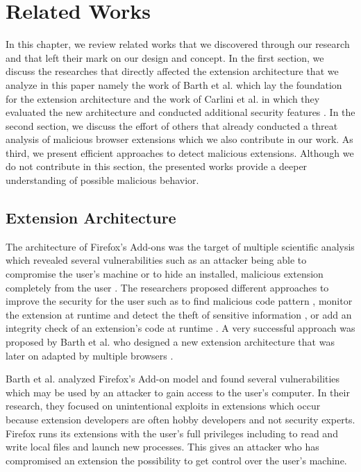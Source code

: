 
\chapter{Related Works}
\label{chp:relatedWorks}

	In this chapter, we review related works that we discovered through our research and that left their mark on our design and concept. In the first section, we discuss the researches that directly affected the extension architecture that we analyze in this paper namely the work of Barth et al. which lay the foundation for the extension architecture and the work of Carlini et al. in which they evaluated the new architecture and conducted additional security features \cite{Barth10protectingbrowsers, Carlini:2012:EGC:2362793.2362800}. In the second section, we discuss the effort of others that already conducted a threat analysis of malicious browser extensions which we also contribute in our work. As third, we present efficient approaches to detect malicious extensions. Although we do not contribute in this section, the presented works provide a deeper understanding of possible malicious behavior.

\section{Extension Architecture}
\label{sec:relatedWorks:extensionArchitecture}

	The architecture of Firefox's Add-ons was the target of multiple scientific analysis which revealed several vulnerabilities such as an attacker being able to compromise the user's machine or to hide an installed, malicious extension completely from the user \cite{Bandhakavi:2011:VBE:1995376.1995398, TerLouw:2007:EWB:1420581.1420583}. The researchers proposed different approaches to improve the security for the user such as to find malicious code pattern \cite{Bandhakavi:2011:VBE:1995376.1995398}, monitor the extension at runtime and detect the theft of sensitive information \cite{Dhawan:2009:AIF:1723192.1723250, cs2015sentinel, TerLouw:2007:EWB:1420581.1420583}, or add an integrity check of an extension's code at runtime \cite{TerLouw:2007:EWB:1420581.1420583}. A very successful approach was proposed by Barth et al. who designed a new extension architecture that was later on adapted by multiple browsers \cite{Barth10protectingbrowsers}. 
	
	Barth et al. analyzed Firefox's Add-on model and found several vulnerabilities which may be used by an attacker to gain access to the user's computer. In their research, they focused on unintentional exploits in extensions which occur because extension developers are often hobby developers and not security experts. Firefox runs its extensions with the user's full privileges including to read and write local files and launch new processes. This gives an attacker who has compromised an extension the possibility to get control over the user's machine. 
	
